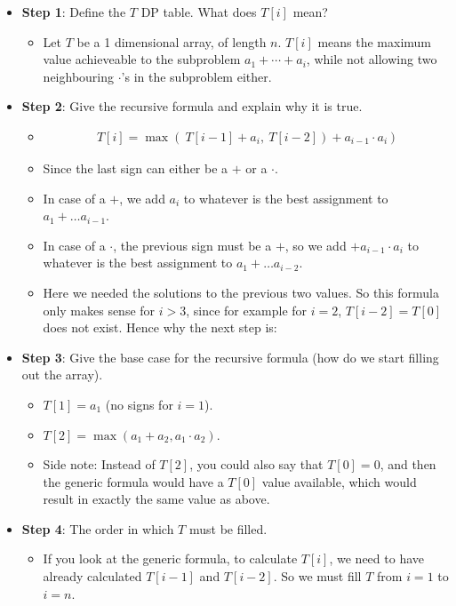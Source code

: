 \begin{itemize}
    \item \textbf{Step 1}: Define the $T$ DP table. What does $T[i]$ mean?
    \begin{itemize}
        \item Let $T$ be a 1 dimensional array, of length $n$. $T[i]$ means the maximum value achieveable to the subproblem $a_1 + \cdots{} + a_{i}$, while not allowing two neighbouring $\cdot{}$'s in the subproblem either.
    \end{itemize}
    \item \textbf{Step 2}: Give the recursive formula and explain why it is true.
    \begin{itemize}
        \item \begin{align*}T[i] = \max(~T[i-1] + a_i,~ T[i-2]) + a_{i-1} \cdot{} a_i~)\end{align*}
        \item Since the last sign can either be a $+$ or a $\cdot{}$.
        \item In case of a $+$, we add $a_i$ to whatever is the best assignment to $a_1 + \dots{} a_{i-1}$.
        \item In case of a $\cdot{}$, the previous sign must be a $+$, so we add $+ a_{i-1} \cdot{} a_i$ to whatever is the best assignment to $a_1 + \dots{} a_{i-2}$.
        \item Here we needed the solutions to the previous two values. So this formula only makes sense for $i>3$, since for example for $i=2$, $T[i-2]=T[0]$ does not exist. Hence why the next step is:
    \end{itemize}
    \item \textbf{Step 3}: Give the base case for the recursive formula (how do we start filling out the array).
    \begin{itemize}
        \item $T[1] = a_1$ (no signs for $i=1$).
        \item $T[2] = \max(a_1 + a_2, a_1\cdot{}a_2)$.
        \item Side note: Instead of $T[2]$, you could also say that $T[0] = 0$, and then the generic formula would have a $T[0]$ value available, which would result in exactly the same value as above.
    \end{itemize}
    \item \textbf{Step 4}: The order in which $T$ must be filled.
    \begin{itemize}
        \item If you look at the generic formula, to calculate $T[i]$, we need to have already calculated $T[i-1]$ and $T[i-2]$. So we must fill $T$ from $i=1$ to $i=n$.

\end{itemize}
\end{itemize}
